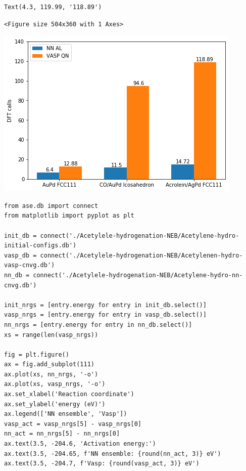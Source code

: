 \documentclass[aps,prl,citeautoscript,preprint,citeautoscript,showkeys]{revtex4-1}
\begin{document}
\begin{verbatim}
Text(4.3, 119.99, '118.89')
\end{verbatim}


\begin{verbatim}
<Figure size 504x360 with 1 Axes>
\end{verbatim}


\begin{center}
\includegraphics[width=.9\linewidth]{obipy-resources/488c510fd61eaf8a765856c1b3f36ad3-27044sOg.png}
\end{center}

\begin{verbatim}
from ase.db import connect
from matplotlib import pyplot as plt

init_db = connect('./Acetylele-hydrogenation-NEB/Acetylene-hydro-initial-configs.db')
vasp_db = connect('./Acetylele-hydrogenation-NEB/Acetylenen-hydro-vasp-cnvg.db')
nn_db = connect('./Acetylele-hydrogenation-NEB/Acetylene-hydro-nn-cnvg.db')

init_nrgs = [entry.energy for entry in init_db.select()]
vasp_nrgs = [entry.energy for entry in vasp_db.select()]
nn_nrgs = [entry.energy for entry in nn_db.select()]
xs = range(len(vasp_nrgs))

fig = plt.figure()
ax = fig.add_subplot(111)
ax.plot(xs, nn_nrgs, '-o')
ax.plot(xs, vasp_nrgs, '-o')
ax.set_xlabel('Reaction coordinate')
ax.set_ylabel('energy (eV)')
ax.legend(['NN ensemble', 'Vasp'])
vasp_act = vasp_nrgs[5] - vasp_nrgs[0]
nn_act = nn_nrgs[5] - nn_nrgs[0]
ax.text(3.5, -204.6, 'Activation energy:')
ax.text(3.5, -204.65, f'NN ensemble: {round(nn_act, 3)} eV')
ax.text(3.5, -204.7, f'Vasp: {round(vasp_act, 3)} eV')
\end{verbatim}
\end{document}
